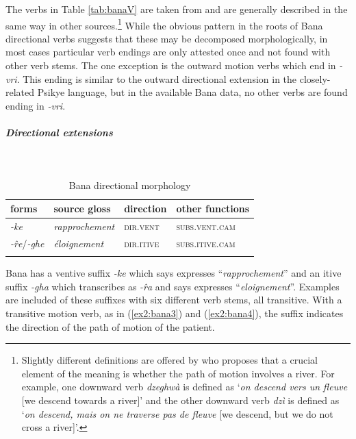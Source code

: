The verbs in Table \ref{tab:banaV} are taken from \citet{gigerBanaProvisionalLexicon2003} and are generally described in the same way in other sources.\footnote{Slightly different definitions are offered by \citet[72]{zuchGrammaireExercicesLangue1977} who proposes that a crucial element of the meaning is whether the path of motion involves a river. For example, one downward verb \textit{dzeghwà} is defined as `\textit{on descend vers un fleuve} [we descend towards a river]' and the other downward verb \textit{dzì} is defined as `\textit{on descend, mais on ne traverse pas de fleuve} [we descend, but we do not cross a river]'.} While the obvious pattern in the roots of Bana directional verbs suggests that these may be decomposed morphologically, in most cases particular verb endings are only attested once and not found with other verb stems. The one exception is the outward motion verbs which end in  \textit{-vri}. This ending is similar to the outward directional extension in the closely-related Psikye language, but in the available Bana data, no other verbs are found ending in \textit{-vri}.

\subparagraph{Directional extensions}~

\begin{table}[H]
	\caption{Bana directional morphology}
	\label{tab:bana}
	\begin{tabular}{llll} %
		\lsptoprule
		forms & source gloss & direction  & other functions  \\ %
		\midrule
		\textit{-ke}  & \textit{rapprochement}  &  \textsc{dir.vent} &   \textsc{subs.vent.cam}  \\
		\textit{-r̂e}/\textit{-ghe}  &  \textit{éloignement}  & \textsc{dir.itive}  & \textsc{subs.itive.cam}  \\
		\lspbottomrule
	\end{tabular}
\end{table} 

Bana has a ventive suffix \textit{-ke} which \citet[44]{zuchGrammaireExercicesLangue1977} says expresses ``\textit{rapprochement}'' and an itive suffix \textit{-gha} which \citet[44]{zuchGrammaireExercicesLangue1977} transcribes as \textit{-r̂a} and says expresses ``\textit{eloignement}''. Examples are included of these suffixes with six different verb stems, all transitive. With a transitive motion verb, as in (\ref{ex2:bana3}) and (\ref{ex2:bana4}), the suffix indicates the direction of the path of motion of the patient. 

